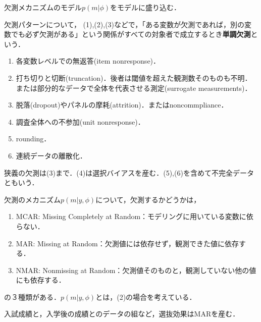 \documentclass[uplatex,dvipdfmx]{jsreport}
\begin{document}
\begin{tcolorbox}[colframe=ForestGreen, colback=ForestGreen!10!white,breakable,colbacktitle=ForestGreen!40!white,coltitle=black,fonttitle=\bfseries\sffamily,
title=]
    欠測メカニズムのモデル$p(m|\phi)$をモデルに盛り込む．
\end{tcolorbox}

\begin{definition}
    欠測パターンについて，
    (1),(2),(3)などで，「ある変数が欠測であれば，別の変数でも必ず欠測がある」という関係がすべての対象者で成立するとき\textbf{単調欠測}という．
\end{definition}

\begin{example}\mbox{}
    \begin{enumerate}
        \item 各変数レベルでの無返答(item nonresponse)．
        \item 打ち切りと切断(truncation)．後者は閾値を超えた観測数そのものも不明．または部分的なデータで全体を代表させる測定(surrogate measurements)．
        \item 脱落(dropout)やパネルの摩耗(attrition)．またはnoncommpliance．
        \item 調査全体への不参加(unit nonresponse)．
        \item rounding．
        \item 連続データの離散化．
    \end{enumerate}
    狭義の欠測は(3)まで．(4)は選択バイアスを産む．(5),(6)を含めて不完全データともいう．
\end{example}

\begin{definition}[Rubin (76)]
    欠測のメカニズム$p(m|y,\phi)$について，欠測するかどうかは，
    \begin{enumerate}
        \item MCAR: Missing Completely at Random：モデリングに用いている変数に依らない．
        \item MAR: Missing at Random：欠測値には依存せず，観測できた値に依存する．
        \item NMAR: Nonmissing at Random：欠測値そのものと，観測していない他の値にも依存する．
    \end{enumerate}
    の３種類がある．$p(m|y,\phi)$とは，(2)の場合を考えている．
\end{definition}

\begin{example}
    入試成績と，入学後の成績とのデータの組など，選抜効果はMARを産む．
\end{example}
\end{document}
